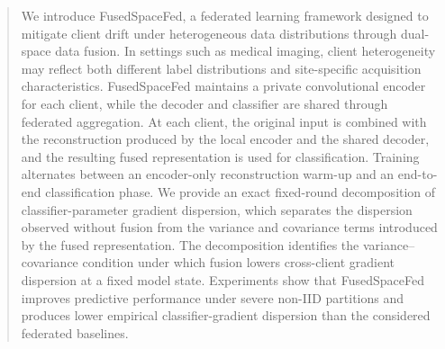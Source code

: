 \documentclass[twoside]{article}
\theoremstyle{thmstyleone}%
\theoremstyle{thmstyletwo}%
\theoremstyle{thmstylethree}%
\begin{document}
%

%


\begin{abstract}
  We introduce FusedSpaceFed, a federated learning framework designed to mitigate client drift under heterogeneous data distributions through dual-space data fusion. In settings such as medical imaging, client heterogeneity may reflect both different label distributions and site-specific acquisition characteristics. FusedSpaceFed maintains a private convolutional encoder for each client, while the decoder and classifier are shared through federated aggregation. At each client, the original input is combined with the reconstruction produced by the local encoder and the shared decoder, and the resulting fused representation is used for classification. Training alternates between an encoder-only reconstruction warm-up and an end-to-end classification phase. We provide an exact fixed-round decomposition of classifier-parameter gradient dispersion, which separates the dispersion observed without fusion from the variance and covariance terms introduced by the fused representation. The decomposition identifies the variance--covariance condition under which fusion lowers cross-client gradient dispersion at a fixed model state. Experiments show that FusedSpaceFed improves predictive performance under severe non-IID partitions and produces lower empirical classifier-gradient dispersion than the considered federated baselines.
\end{abstract}
\end{document}
